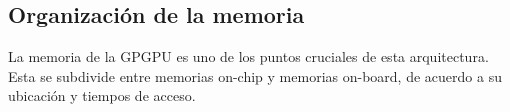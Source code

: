 

\subsection{Organizaci\'on de la memoria}

%
%
La memoria de la GPGPU es uno de los puntos cruciales de esta arquitectura. Esta se subdivide
entre memorias on-chip y memorias on-board, de acuerdo a su ubicaci\'on y tiempos de acceso.

